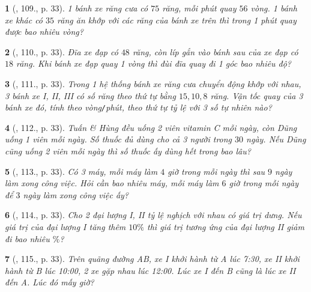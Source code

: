 \documentclass{article}
\newtheorem{baitoan}{}
\begin{document}
\begin{baitoan}[\cite{Binh_Toan_7_tap_1}, 109., p. 33]
	1 bánh xe răng cưa có $75$ răng, mỗi phút quay $56$ vòng. 1 bánh xe khác có $35$ răng ăn khớp với các răng của bánh xe trên thì trong 1 phút quay được bao nhiêu vòng?
\end{baitoan}

\begin{baitoan}[\cite{Binh_Toan_7_tap_1}, 110., p. 33]
	Đĩa xe đạp có $48$ răng, còn líp gắn vào bánh sau của xe đạp có $18$ răng. Khi bánh xe đạp quay 1 vòng thì đùi đĩa quay đi 1 góc bao nhiêu độ?
\end{baitoan}

\begin{baitoan}[\cite{Binh_Toan_7_tap_1}, 111., p. 33]
	Trong 1 hệ thống bánh xe răng cưa chuyển động khớp với nhau, 3 bánh xe I, II, III có số răng theo thứ tự bằng $15,10,8$ răng. Vận tốc quay của 3 bánh xe đó, tính theo vòng{\tt/}phút, theo thứ tự tỷ lệ với 3 số tự nhiên nào?
\end{baitoan}

\begin{baitoan}[\cite{Binh_Toan_7_tap_1}, 112., p. 33]
	Tuấn \& Hùng đều uống 2 viên vitamin C mỗi ngày, còn Dũng uống 1 viên mỗi ngày. Số thuốc đủ dùng cho cả 3 người trong $30$ ngày. Nếu Dũng cũng uống 2 viên mỗi ngày thì số thuốc ấy dùng hết trong bao lâu?
\end{baitoan}

\begin{baitoan}[\cite{Binh_Toan_7_tap_1}, 113., p. 33]
	Có 3 máy, mỗi máy làm $4$ giờ trong mỗi ngày thì sau $9$ ngày làm xong công việc. Hỏi cần bao nhiêu máy, mỗi máy làm $6$ giờ trong mỗi ngày để $3$ ngày làm xong công việc ấy?
\end{baitoan}

\begin{baitoan}[\cite{Binh_Toan_7_tap_1}, 114., p. 33]
	Cho 2 đại lượng I, II tỷ lệ nghịch với nhau có giá trị dưng. Nếu giá trị của đại lượng I tăng thêm $10\%$ thì giá trị tương ứng của đại lượng II giảm đi bao nhiêu $\%$?
\end{baitoan}

\begin{baitoan}[\cite{Binh_Toan_7_tap_1}, 115., p. 33]
	Trên quãng đường AB, xe I khởi hành từ A lúc {\rm7:30}, xe II khởi hành từ B lúc {\rm10:00}, 2 xe gặp nhau lúc {\rm12:00}. Lúc xe I đến B cũng là lúc xe II đến A. Lúc đó mấy giờ?
\end{baitoan}

\end{document}
